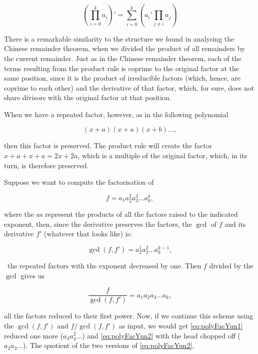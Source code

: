 \documentclass[tikz]{scrreprt}
\begin{document}
\begin{equation}\label{eq:polyFacProductRule}
\left(\prod_{i=0}^k{a_i}\right)' = 
\sum_{i=0}^k{\left(a_i'\prod_{j\neq i}{a_j}\right)}
\end{equation}

There is a remarkable similarity to the structure
we found in analysing the Chinese remainder theorem,
when we divided the product of all remainders by
the current remainder. Just as in the Chinese remainder
theorem, each of the terms resulting from the product
rule is coprime to the original factor at the same position,
since it is the product of irreducible factors 
(which, hence, are coprime to each other) and the derivative
of that factor, which, for sure, does not share
divisors with the original factor at that position.

When we have a repeated factor, however, as in
the following polynomial

\[
(x+a)(x+a)(x+b)\dots,
\]

then this factor is preserved. The product rule
will create the factor $x+a+x+a=2x+2a$, which
is a multiple of the original factor, which,
in its turn, is therefore preserved.

Suppose we want to compute the factorisation
of 

\begin{equation}
f = a_1a_2^2a_3^3\dots a_k^k,
\end{equation}

where the $a$s represent the products of all
the factors raised to the indicated exponent,
then, since the derivative preserves the factors,
the $\gcd$ of $f$ and its derivative $f'$
(whatever that looks like) is:

\begin{equation}\label{eq:polyFacYun1}
\gcd(f,f') = a_2^1a_3^2\dots a_k^{k-1},
\end{equation}

\ie\, the repeated factors with the exponent
decreased by one. Then $f$ divided by the $\gcd$
gives us

\begin{equation}\label{eq:polyFacYun2}
\frac{f}{\gcd(f,f')} = a_1a_2a_3\dots a_k,
\end{equation}

all the factors reduced to their first power.
Now, if we continue this scheme using
the $\gcd(f,f')$ and $f/\gcd(f,f')$ as input,
we would get \ref{eq:polyFacYun1} 
reduced one more ($a_3a_4^2\dots$) and
\ref{eq:polyFacYun2} with the head chopped off
($a_2a_3\dots$). The quotient of the two
versions of \ref{eq:polyFacYun2}, \ie\
\end{document}
